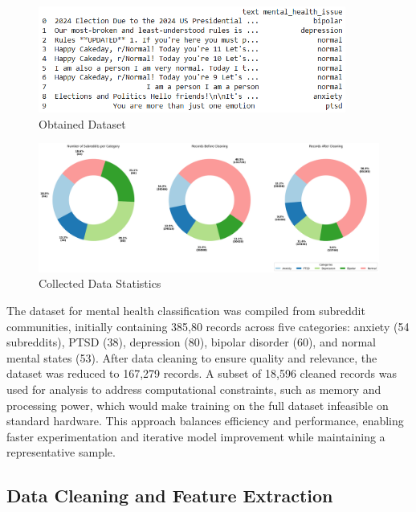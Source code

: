 \begin{figure}[h!]  
    \centering
    \includegraphics[width=0.9\textwidth]{Images/Dataset.png}  
    \caption*{Obtained Dataset}
    \label{LSTMROC711}  %
\end{figure}



\begin{figure}[h!]  
    \centering
    \includegraphics[width=1.0\textwidth]{Images/Data Collection Graph.png}  
    \caption*{Collected Data Statistics}
    \label{LSTMROC7uyiut11}  %
\end{figure}

\noindent
The dataset for mental health classification was compiled from subreddit communities, initially containing 385,80 records across five categories: anxiety (54 subreddits), PTSD (38), depression (80), bipolar disorder (60), and normal mental states (53). After data cleaning to ensure quality and relevance, the dataset was reduced to 167,279 records. A subset of 18,596 cleaned records was used for analysis to address computational constraints, such as memory and processing power, which would make training on the full dataset infeasible on standard hardware. This approach balances efficiency and performance, enabling faster experimentation and iterative model improvement while maintaining a representative sample.





\subsection{Data Cleaning and Feature Extraction}


